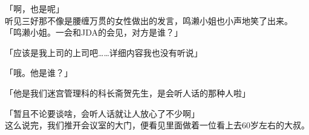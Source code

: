 「啊，也是呢」\\

听见三好那不像是腰缠万贯的女性做出的发言，鸣濑小姐也小声地笑了出来。\\

「鸣濑小姐。一会和JDA的会见，对方是谁？」

「应该是我上司的上司吧……详细内容我也没有听说」

「哦。他是谁？」

「他是我们迷宫管理科的科长斋贺先生，是会听人话的那种人啦」

「暂且不论要谈啥，会听人话就让人放心了不少啊」\\

这么说完，我们推开会议室的大门，便看见里面做着一位看上去60岁左右的大叔。\\
